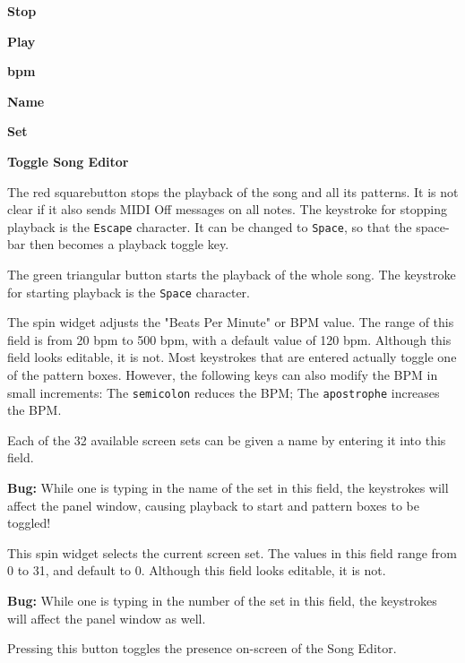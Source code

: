    \begin{enumber}
      \item \textbf{Stop}
      \item \textbf{Play}
      \item \textbf{bpm}
      \item \textbf{Name}
      \item \textbf{Set}
      \item \textbf{Toggle Song Editor}
   \end{enumber}

   \setcounter{ItemCounter}{0}      %

   The red squarebutton stops the playback of the song and all its patterns.
   It is not clear if it also sends MIDI Off messages on all notes.
   The keystroke for stopping playback is the \texttt{Escape} character.
   It can be changed to \texttt{Space}, so that the space-bar then becomes a
   playback toggle key.

   The green triangular button starts the playback of the whole song.
   The keystroke for starting playback is the \texttt{Space} character.

   The spin widget adjusts the "Beats Per Minute" or BPM value.  The
   range of this field is from 20 bpm to 500 bpm, with a default value of
   120 bpm.
   Although this field looks editable, it is not.  Most keystrokes
   that are entered actually toggle one of the pattern boxes.
   However, the following keys can also modify the BPM in small increments:
    The \texttt{semicolon} reduces the BPM;
    The \texttt{apostrophe} increases the BPM.

   Each of the 32 available screen sets can be given a name by entering it
   into this field.

   \textbf{Bug:}
   While one is typing in the name of the set in this field, the keystrokes
   will affect the panel window, causing playback to start and pattern
   boxes to be toggled!

   This spin widget selects the current screen set.  The values in this
   field range from 0 to 31, and default to 0.
   Although this field looks editable, it is not.

   \textbf{Bug:}
   While one is typing in the number of the set in this field, the keystrokes
   will affect the panel window as well.

   Pressing this button toggles the presence on-screen of the Song
   Editor.

